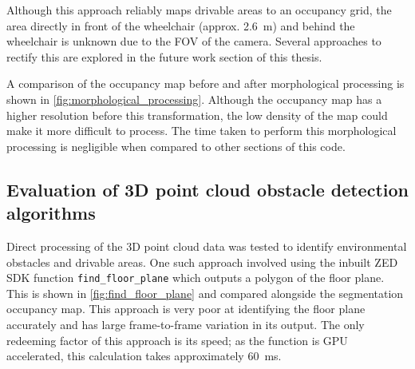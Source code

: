Although this approach reliably maps drivable areas to an occupancy grid,
the area directly in front of the wheelchair (approx. \SI{2.6}{\metre}) and behind the wheelchair is unknown due to the FOV of the camera.
Several approaches to rectify this are explored in the future work section of this thesis.

A comparison of the occupancy map before and after morphological processing is shown in \cref{fig:morphological_processing}.
Although the occupancy map has a higher resolution before this transformation, the low density of the map
could make it more difficult to process. The time taken to perform this morphological processing is negligible
when compared to other sections of this code.

\pagebreak
\subsection{Evaluation of 3D point cloud obstacle detection algorithms}
Direct processing of the 3D point cloud data was tested to identify environmental obstacles and drivable areas.
One such approach involved using the inbuilt ZED SDK function \texttt{find\_floor\_plane}
which outputs a polygon of the floor plane.
This is shown in \cref{fig:find_floor_plane} and compared alongside the segmentation occupancy map.
This approach is very poor at identifying the floor plane accurately and has large frame-to-frame
variation in its output. The only redeeming factor of this approach is its speed;
as the function is GPU accelerated, this calculation takes approximately \SI{60}{\milli\second}.

